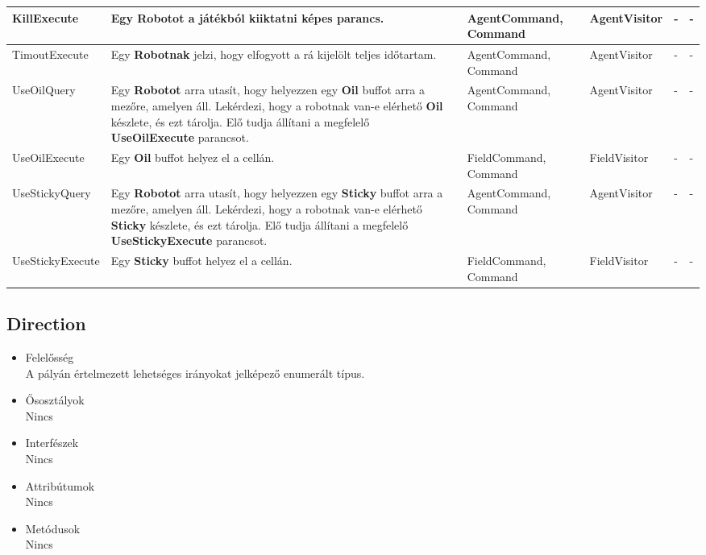 \begin{tabularx}{\linewidth}{| p{4cm} | X | p{2.5cm} | l | p{1.2cm} | p{1.2cm} |}
KillExecute & Egy \textbf{Robotot} a játékból kiiktatni képes parancs. & AgentCommand, Command & AgentVisitor & - & - \tabularnewline\hline

TimoutExecute & Egy \textbf{Robotnak} jelzi, hogy elfogyott a rá kijelölt teljes időtartam. & AgentCommand, Command & AgentVisitor & - & - \tabularnewline\hline

UseOilQuery & Egy \textbf{Robotot} arra utasít, hogy helyezzen egy \textbf{Oil} buffot arra a mezőre, amelyen áll. Lekérdezi, hogy a robotnak van-e elérhető \textbf{Oil} készlete, és ezt tárolja. Elő tudja állítani a megfelelő \textbf{UseOilExecute} parancsot. & AgentCommand, Command & AgentVisitor & - & - \tabularnewline\hline

UseOilExecute & Egy \textbf{Oil} buffot helyez el a cellán. &  FieldCommand, Command & FieldVisitor & - & -\tabularnewline\hline

UseStickyQuery & Egy \textbf{Robotot} arra utasít, hogy helyezzen egy \textbf{Sticky} buffot arra a mezőre, amelyen áll. Lekérdezi, hogy a robotnak van-e elérhető \textbf{Sticky} készlete, és ezt tárolja. Elő tudja állítani a megfelelő \textbf{UseStickyExecute} parancsot. & AgentCommand, Command & AgentVisitor & - & - \tabularnewline\hline

UseStickyExecute & Egy \textbf{Sticky} buffot helyez el a cellán. &  FieldCommand, Command & FieldVisitor & - & -\tabularnewline\hline
\end{tabularx}

\subsection{Direction}
\begin{itemize}

\item Felelősség\\
A pályán értelmezett lehetséges irányokat jelképező enumerált típus.

\item Ősosztályok\\
Nincs

\item Interfészek\\
Nincs

\item Attribútumok\\
Nincs

\item Metódusok\\
Nincs

\end{itemize}

